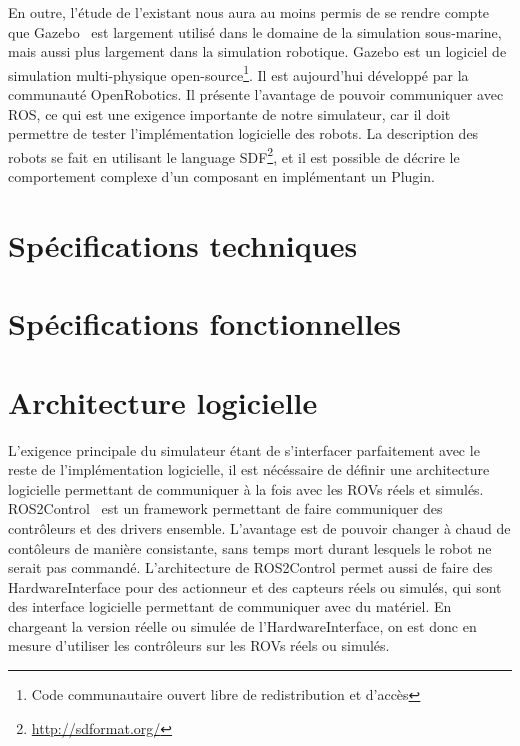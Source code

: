         En outre, l'étude de l'existant nous aura au moins permis de se rendre compte que \gls{Gazebo}~\cite{Koenig-gazebo} est largement utilisé dans le domaine de la simulation sous-marine, mais aussi plus largement dans la simulation robotique. \gls{Gazebo} est un logiciel de simulation multi-physique open-source\footnote{Code communautaire ouvert libre de redistribution et d'accès}. Il est aujourd'hui développé par la communauté \gls{OpenRobotics}. Il présente l'avantage de pouvoir communiquer avec \gls{ROS}, ce qui est une exigence importante de notre simulateur, car il doit permettre de tester l'implémentation logicielle des robots. La description des robots se fait en utilisant le language \gls{SDF}\footnote{\url{http://sdformat.org/}}, et il est possible de décrire le comportement complexe d'un composant en implémentant un \gls{Plugin}.


    \section{Spécifications techniques}

    \section{Spécifications fonctionnelles}

    \section{Architecture logicielle}

        L'exigence principale du simulateur étant de s'interfacer parfaitement avec le reste de l'implémentation logicielle, il est nécéssaire de définir une architecture logicielle permettant de communiquer à la fois avec les \gls{ROV}s réels et simulés. \gls{ROS2Control}~\cite{ros_control} est un framework permettant de faire communiquer des contrôleurs et des drivers ensemble. L'avantage est de pouvoir changer à chaud de contôleurs de manière consistante, sans temps mort durant lesquels le robot ne serait pas commandé. L'architecture de \gls{ROS2Control} permet aussi de faire des \gls{HardwareInterface} pour des actionneur et des capteurs réels ou simulés, qui sont des interface logicielle permettant de communiquer avec du matériel. En chargeant la version réelle ou simulée de l'\gls{HardwareInterface}, on est donc en mesure d'utiliser les contrôleurs sur les \gls{ROV}s réels ou simulés.


